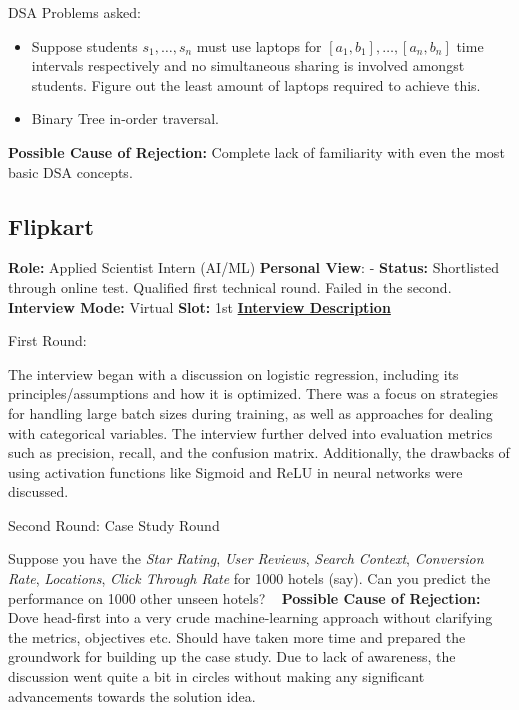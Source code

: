 \documentclass[12pt]{article}
\begin{document}
DSA Problems asked:
\begin{itemize}
    \item Suppose students $s_1, \dots, s_n$ must use laptops for $[a_1, b_1], \dots, [a_n, b_n]$ time intervals respectively and no simultaneous sharing is involved amongst students. Figure out the least amount of laptops required to achieve this.
    \item Binary Tree in-order traversal.
\end{itemize}

\textbf{Possible Cause of Rejection:} Complete lack of familiarity with even the most basic DSA concepts. 


\subsection{Flipkart}
\textbf{Role:} Applied Scientist Intern (AI/ML)
\newline
\textbf{Personal View}: -
\newline
\textbf{Status:} Shortlisted through online test. Qualified first technical round. Failed in the second.
\newline
\textbf{Interview Mode:} Virtual
\newline
\textbf{Slot:} 1st
\newline
\vspace{10pt}
\newline
\underline{\textbf{Interview Description}}
\newline

First Round:

The interview began with a discussion on logistic regression, including its principles/assumptions and how it is optimized. There was a focus on strategies for handling large batch sizes during training, as well as approaches for dealing with categorical variables. The interview further delved into evaluation metrics such as precision, recall, and the confusion matrix. Additionally, the drawbacks of using activation functions like Sigmoid and ReLU in neural networks were discussed.

Second Round: Case Study Round

Suppose you have the \textit{Star Rating}, \textit{User Reviews}, \textit{Search Context}, \textit{Conversion Rate}, \textit{Locations}, \textit{Click Through Rate} for 1000 hotels (say). Can you predict the performance on 1000 other unseen hotels? 
\newline
\vspace{1pt}\
\newline
\textbf{Possible Cause of Rejection:} Dove head-first into a very crude machine-learning approach without clarifying the metrics, objectives etc. Should have taken more time and prepared the groundwork for building up the case study. Due to lack of awareness, the discussion went quite a bit in circles without making any significant advancements towards the solution idea.
\end{document}
